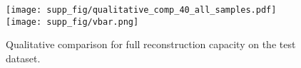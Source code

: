     


\begin{figure*}
  \centering
%
  {\texttt{[image: supp\_fig/qualitative\_comp\_40\_all\_samples.pdf]}}
    \texttt{[image: supp\_fig/vbar.png]}

   \caption{Qualitative comparison for full reconstruction capacity on the test dataset.}

   \label{fig:qual_comp}
\end{figure*}



